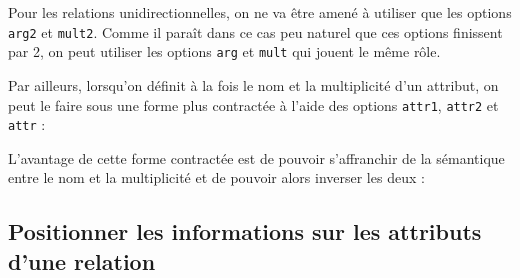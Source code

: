 \documentclass[a4paper,11pt]{report}
\newcommand{\inputTikZ}[1]{%
  }%
\newcommand{\inputTikZ}[1]{%
    \texttt{[image: fig/\#1.pdf]}%
  }%
\begin{document}
\medskip

\begin{minipage}{0.5\textwidth}

\end{minipage}
\begin{minipage}{0.4\textwidth}
\begin{center}
\inputTikZ{relationarg}
\end{center}
\end{minipage}

\medskip

Pour les relations unidirectionnelles, on ne va être amené à utiliser que les options {\tt arg2} et {\tt mult2}. Comme il paraît dans ce cas peu naturel que ces options finissent par 2, on peut utiliser les options {\tt arg} et {\tt mult} qui jouent le même rôle.

Par ailleurs, lorsqu'on définit à la fois le nom et la multiplicité d'un attribut, on peut le faire sous une forme plus contractée à l'aide des options {\tt attr1}, {\tt attr2} et {\tt attr} :

\medskip

\begin{minipage}{0.5\textwidth}

\end{minipage}
\begin{minipage}{0.4\textwidth}
\begin{center}
\inputTikZ{relationattr}
\end{center}
\end{minipage}

\medskip

L'avantage de cette forme contractée est de pouvoir s'affranchir de la sémantique entre le nom et la multiplicité et de pouvoir alors inverser les deux :

\medskip

\begin{minipage}{0.5\textwidth}

\end{minipage}
\begin{minipage}{0.4\textwidth}
\begin{center}
\inputTikZ{relationattr2}
\end{center}
\end{minipage}

\medskip

\subsection{Positionner les informations sur les attributs d'une relation}\label{ss.relposattr}
\end{document}
